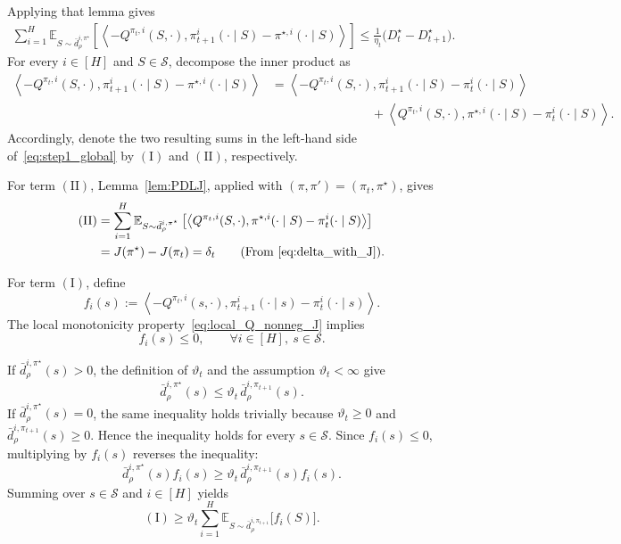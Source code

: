 \documentclass[11pt]{article}
\begin{document}
Applying that lemma gives
\begin{align}
\label{eq:step1_global}
\sum_{i=1}^H
\mathbb E_{S\sim\bar d^{i,\pi^\star}_\rho}
\left[
\left\langle
-Q^{\pi_t,i}(S,\cdot),
\pi_{t+1}^i(\cdot\mid S)-\pi^{\star,i}(\cdot\mid S)
\right\rangle
\right]
\le
\frac{1}{\eta_t}
\bigl(D_t^\star-D_{t+1}^\star\bigr).
\end{align}
For every $i\in[H]$ and $S\in\mathcal S$, decompose the inner product as
\begin{align*}
\left\langle
-Q^{\pi_t,i}(S,\cdot),
\pi_{t+1}^i(\cdot\mid S)-\pi^{\star,i}(\cdot\mid S)
\right\rangle & =
\left\langle
-Q^{\pi_t,i}(S,\cdot),
\pi_{t+1}^i(\cdot\mid S)-\pi_t^i(\cdot\mid S)
\right\rangle
\\
& \qquad \qquad \qquad \qquad +
\left\langle
Q^{\pi_t,i}(S,\cdot),
\pi^{\star,i}(\cdot\mid S)-\pi_t^i(\cdot\mid S)
\right\rangle.
\end{align*}
Accordingly, denote the two resulting sums in the left-hand side
of~\eqref{eq:step1_global} by $(\mathrm I)$ and $(\mathrm{II})$,
respectively.

For term $(\mathrm{II})$, Lemma~\ref{lem:PDLJ}, applied with
$(\pi,\pi')=(\pi_t,\pi^\star)$, gives
\begin{align*}
(\mathrm{II})
&=
\sum_{i=1}^H
\mathbb E_{S\sim\bar d^{i,\pi^\star}_\rho}
\left[
\left\langle
Q^{\pi_t,i}(S,\cdot),
\pi^{\star,i}(\cdot\mid S)-\pi_t^i(\cdot\mid S)
\right\rangle
\right]
\\
&=
J(\pi^\star)-J(\pi_t)
=
\delta_t \tag{From~\eqref{eq:delta_with_J}}.
\end{align*}

For term $(\mathrm I)$, define
\[
f_i(s)
:=
\left\langle
-Q^{\pi_t,i}(s,\cdot),
\pi_{t+1}^i(\cdot\mid s)-\pi_t^i(\cdot\mid s)
\right\rangle.
\]
The local monotonicity property~\eqref{eq:local_Q_nonneg_J} implies
\[
f_i(s)\le0,
\qquad
\forall i\in[H],\ s\in\mathcal S.
\]

If $\bar d^{i,\pi^\star}_\rho(s)>0$, the definition of
$\vartheta_t$ and the assumption $\vartheta_t<\infty$ give
\[
\bar d^{i,\pi^\star}_\rho(s)
\le
\vartheta_t\,
\bar d^{i,\pi_{t+1}}_\rho(s).
\]
If $\bar d^{i,\pi^\star}_\rho(s)=0$, the same inequality holds
trivially because $\vartheta_t\ge0$ and
$\bar d^{i,\pi_{t+1}}_\rho(s)\ge0$. Hence the inequality holds for
every $s\in\mathcal S$. Since $f_i(s)\le0$, multiplying by $f_i(s)$
reverses the inequality:
\[
\bar d^{i,\pi^\star}_\rho(s)f_i(s)
\ge
\vartheta_t\,
\bar d^{i,\pi_{t+1}}_\rho(s)f_i(s).
\]
Summing over $s\in\mathcal S$ and $i\in[H]$ yields
\begin{equation}
\label{eq:I_lower}
(\mathrm I)
\ge
\vartheta_t
\sum_{i=1}^H
\mathbb E_{S\sim\bar d^{i,\pi_{t+1}}_\rho}
\bigl[f_i(S)\bigr].
\end{equation}
\end{document}
